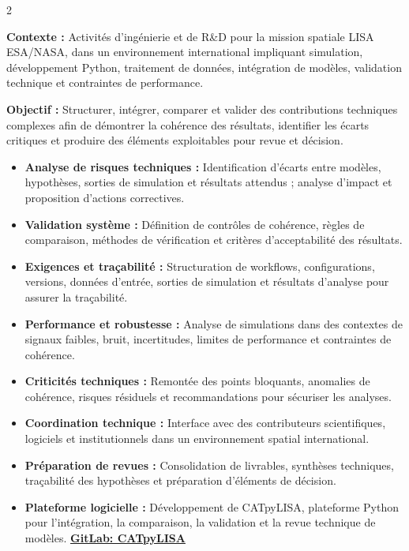 \documentclass[8pt,a4paper,ragged2e,withhyper]{altacv}
\begin{document}
\begin{paracol}{2}
\divider


\textbf{Contexte :} Activités d’ingénierie et de R\&D pour la mission spatiale LISA ESA/NASA, dans un environnement international impliquant simulation, développement Python, traitement de données, intégration de modèles, validation technique et contraintes de performance.

\textbf{Objectif :} Structurer, intégrer, comparer et valider des contributions techniques complexes afin de démontrer la cohérence des résultats, identifier les écarts critiques et produire des éléments exploitables pour revue et décision.

\begin{itemize}
  \item \textbf{Analyse de risques techniques :} Identification d’écarts entre modèles, hypothèses, sorties de simulation et résultats attendus ; analyse d’impact et proposition d’actions correctives.
  \item \textbf{Validation système :} Définition de contrôles de cohérence, règles de comparaison, méthodes de vérification et critères d’acceptabilité des résultats.
  \item \textbf{Exigences et traçabilité :} Structuration de workflows, configurations, versions, données d’entrée, sorties de simulation et résultats d’analyse pour assurer la traçabilité.
  \item \textbf{Performance et robustesse :} Analyse de simulations dans des contextes de signaux faibles, bruit, incertitudes, limites de performance et contraintes de cohérence.
  \item \textbf{Criticités techniques :} Remontée des points bloquants, anomalies de cohérence, risques résiduels et recommandations pour sécuriser les analyses.
  \item \textbf{Coordination technique :} Interface avec des contributeurs scientifiques, logiciels et institutionnels dans un environnement spatial international.
  \item \textbf{Préparation de revues :} Consolidation de livrables, synthèses techniques, traçabilité des hypothèses et préparation d’éléments de décision.
  \item \textbf{Plateforme logicielle :} Développement de CATpyLISA, plateforme Python pour l’intégration, la comparaison, la validation et la revue technique de modèles.
  \textcolor{DarkPastelRed}{\href{https://gitlab.oca.eu/gboileau/lisa_l3_tools}{\bf GitLab: CATpyLISA}}
\end{itemize}


\end{paracol}
\end{document}
